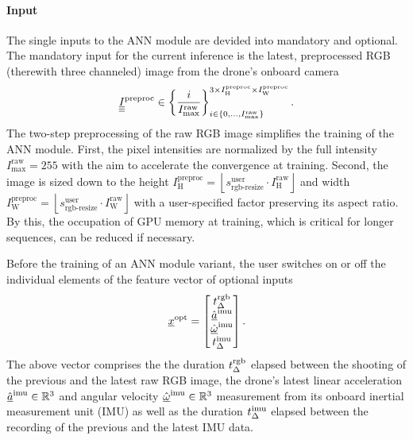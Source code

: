 \paragraph*{Input} ${}$\\
The single inputs to the ANN module are devided into mandatory and optional.
The mandatory input for the current inference is the
latest, preprocessed RGB (therewith three channeled) image from the drone's onboard camera
\begin{equation}
    \underline{\underline{\underline I}}^\text{preproc}
    \in 
    \left\{
        \frac{i}{I_\text{max}^\text{raw}}
    \right\}
    _{
        i \in 
        \left\{
            0,\dots,I_\text{max}^\text{raw}
        \right\}
    }
    ^{
        3 \times
        I_\text{H}^\text{preproc} \times 
        I_\text{W}^\text{preproc}
    }.
\end{equation}
The two-step preprocessing of the raw RGB image simplifies the training of the ANN module.
First, the pixel intensities are normalized by the full intensity 
$I_\text{max}^\text{raw} = 255$
with the aim to accelerate the convergence at training.
Second, the image is sized down 
to the height 
$
    I_\text{H}^\text{preproc} 
    = 
    \left\lfloor
    s^\text{user}_\text{rgb-resize}
    \cdot
    I_\text{H}^\text{raw}
    \right\rfloor
$
and width
$
    I_\text{W}^\text{preproc} 
    = 
    \left\lfloor
    s^\text{user}_\text{rgb-resize}
    \cdot
    I_\text{W}^\text{raw}
    \right\rfloor
$
with a user-specified 
factor preserving its aspect ratio.
By this, the occupation of GPU memory at training,
which is critical for longer sequences,
can be reduced if necessary.



Before the training of an ANN module variant, the user switches on or off
the individual elements of the feature vector of optional inputs
\begin{align}
    \featvec[]{\text{opt}}{}{}{} 
    =
    \begin{bmatrix}
        \dur[]{\text{rgb}}{}{}{} \\
        \acc[\hat]{\text{imu}}{}{}{} \\
        \angvel[\hat]{\text{imu}}{}{}{} \\
        \dur[]{\text{imu}}{}{}{}
    \end{bmatrix}
    .
\end{align}
The above vector comprises the
the duration
$\dur[]{\text{rgb}}{}{}{}$
elapsed between the shooting of the previous and the latest raw RGB image,
the drone's latest linear acceleration
$\acc[\hat]{\text{imu}}{}{}{} \in \mathbb{R}^3$
and angular velocity
$\angvel[\hat]{\text{imu}}{}{}{} \in \mathbb{R}^3$
measurement from its onboard inertial measurement unit (IMU)
as well as the duration
$\dur[]{\text{imu}}{}{}{}$
elapsed between the recording of the previous and the latest IMU data.








